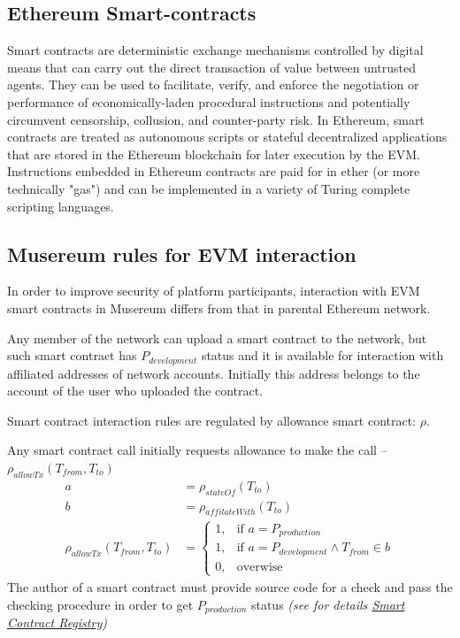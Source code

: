 \documentclass[12pt]{report}
\begin{document}
\subsection{Ethereum Smart-contracts}
\label{tech-blockchain-contracts}
Smart contracts are deterministic exchange mechanisms controlled by digital means that can carry out the direct transaction of value between untrusted agents. They can be used to facilitate, verify, and enforce the negotiation or performance of economically-laden procedural instructions and potentially circumvent censorship, collusion, and counter-party risk. In Ethereum, smart contracts are treated as autonomous scripts or stateful decentralized applications that are stored in the Ethereum blockchain for later execution by the EVM. Instructions embedded in Ethereum contracts are paid for in ether (or more technically "gas") and can be implemented in a variety of Turing complete scripting languages.
\subsection{Musereum rules for EVM interaction}
\label{tech-blockchain-rules}
In order to improve security of platform participants, interaction with EVM smart contracts in Musereum differs from that in parental Ethereum network.

Any member of the network can upload a smart contract to the network, but such smart contract has $P_{development}$ status and it is available for interaction with affiliated addresses of network accounts. Initially this address belongs to the account of the user who uploaded the contract.

Smart contract interaction rules are regulated by allowance smart contract: $\rho$.

Any smart contract call initially requests allowance to make the call – $\rho_{allowTx}(T_{from}, T_{to})$
\begin{align}
a &= \rho_{stateOf}(T_{to}) \nonumber\\
b &= \rho_{affilateWith}(T_{to}) \nonumber\\
\rho_{allowTx}(T_{from}, T_{to}) &= \begin{cases}1, & \text{if } a = P_{production} \\ 1, & \text{if } a = P_{development} \wedge T_{from} \in b \\ 0, & \text{overwise} \end{cases}
\end{align}
The author of a smart contract must provide source code for a check and pass the checking procedure in order to get $P_{production}$ status \textit{(see for details \hyperref[tech-apps-contracts-registry]{Smart Contract Registry})}
\end{document}
